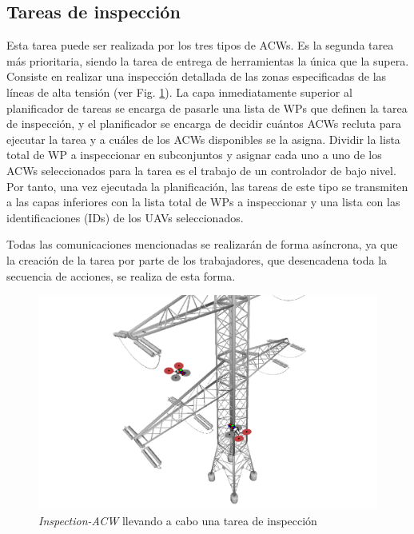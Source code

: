 \documentclass[fontsize=11pt, English=false, Español=true, Myfinal=true, twoside, numbers=noenddot]{scrbook}
\begin{document}
\subsection{Tareas de inspección}
\label{subsec:InspectionTasks}
Esta tarea puede ser realizada por los tres tipos de \glspl{ACW}. Es la segunda tarea más prioritaria, siendo la tarea de entrega de herramientas la única que la supera. Consiste en realizar una inspección detallada de las zonas especificadas de las líneas de alta tensión (ver Fig. \ref{fig:inspection_task}). La capa inmediatamente superior al planificador de tareas se encarga de pasarle una lista de \glspl{WP} que definen la tarea de inspección, y el planificador se encarga de decidir cuántos \glspl{ACW} recluta para ejecutar la tarea y a cuáles de los \glspl{ACW} disponibles se la asigna. Dividir la lista total de \gls{WP} a inspeccionar en subconjuntos y asignar cada uno a uno de los \glspl{ACW} seleccionados para la tarea es el trabajo de un controlador de bajo nivel. Por tanto, una vez ejecutada la planificación, las tareas de este tipo se transmiten a las capas inferiores con la lista total de \glspl{WP} a inspeccionar y una lista con las identificaciones (\glspl{ID}) de los \glspl{UAV} seleccionados.

Todas las comunicaciones mencionadas se realizarán de forma asíncrona, ya que la creación de la tarea por parte de los trabajadores, que desencadena toda la secuencia de acciones, se realiza de esta forma.

\begin{figure}[htbp]
    \centering
    \includegraphics[width=.75\linewidth]
    {ProblemFormulation/figures/inspection_task.pdf}
    \caption{\textit{Inspection-ACW} llevando a cabo una tarea de inspección}
    \label{fig:inspection_task}
\end{figure}
\end{document}
